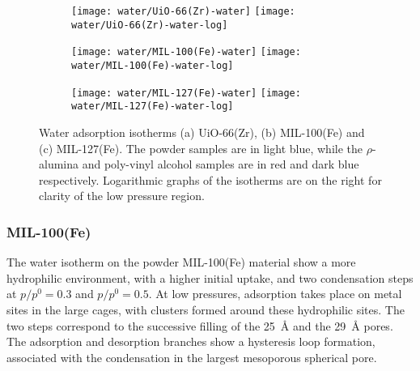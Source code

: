 \begin{figure}[p!]
    \centering

    \begin{subfigure}{\linewidth}
        \centering
        \parbox{0.1\linewidth}{\caption{}\label{shaping:fgr:wateruio66}}%
        \texttt{[image: water/UiO-66(Zr)-water]}%
        \texttt{[image: water/UiO-66(Zr)-water-log]}%
    \end{subfigure}

    \begin{subfigure}{\linewidth}
        \centering
        \parbox{0.1\linewidth}{\caption{}\label{shaping:fgr:watermil100}}%
        \texttt{[image: water/MIL-100(Fe)-water]}%
        \texttt{[image: water/MIL-100(Fe)-water-log]}%
    \end{subfigure}

    \begin{subfigure}{\linewidth}
        \centering
        \parbox{0.1\linewidth}{\caption{}\label{shaping:fgr:watermil127}}%
        \texttt{[image: water/MIL-127(Fe)-water]}%
        \texttt{[image: water/MIL-127(Fe)-water-log]}%
    \end{subfigure}
    
    \caption{Water adsorption isotherms (a) UiO-66(Zr), 
    (b) MIL-100(Fe) and (c) MIL-127(Fe). The powder samples are in light
    blue, while the \(\rho\)-alumina and poly-vinyl alcohol samples are in red
    and dark blue respectively. Logarithmic graphs of the isotherms are
    on the right for clarity of the low
    pressure region.}%
    \label{shaping:fgr:wateradsorption}
\end{figure}

\subsubsection{MIL-100(Fe)}

The water isotherm on the powder MIL-100(Fe) material show a more 
hydrophilic environment, with a higher initial uptake, and two 
condensation steps at \(p/p^0 = 0.3\) and \(p/p^0 = 0.5\).
At low pressures, adsorption takes place on metal sites in the 
large cages, with clusters formed around these hydrophilic
sites. The two steps correspond to the successive filling of the 
\SI{25}{\angstrom} and the \SI{29}{\angstrom} pores. The
adsorption and desorption branches show a hysteresis loop 
formation, associated with the condensation in the largest 
mesoporous spherical pore.

